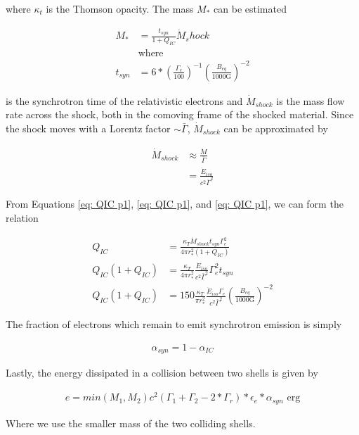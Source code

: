 \documentclass[linenumbers,twocolumn]{aastex631}
\begin{document}
where $\kappa_t$ is the Thomson opacity. The mass $M_{*}$ can be estimated

\begin{align} \label{eq: QIC p2}
	M_{*} &= \frac{t_{syn}}{1+Q_{IC}} \dot{M}_shock \\
	&\text{where}\\
	t_{syn} &= 6*\left(\frac{\Gamma_e}{100}\right)^{-1} \left(\frac{B_{eq}}{1000\text{G}}\right)^{-2}
\end{align}

is the synchrotron time of the relativistic electrons and $\dot{M}_{shock}$ is the mass flow rate across the shock, both in the comoving frame of the shocked material. Since the shock moves with a Lorentz factor $\sim \bar{\Gamma}$, $\dot{M}_{shock}$ can be approximated by 

\begin{align} \label{eq: QIC p3}
	\dot{M}_{shock} &\approx \frac{\dot{M}}{\bar{\Gamma}} \\
	&= \frac{\dot{E}_{iso}}{c^2 \bar{\Gamma}^2} 
\end{align}

From Equations \ref{eq: QIC p1}, \ref{eq: QIC p1}, and \ref{eq: QIC p1}, we can form the relation

\begin{align}
	Q_{IC} &= \frac{\kappa_T \dot{M}_{shock} t_{syn} \Gamma_e^2}{4\pi r_{*}^2 (1+Q_{IC})}\\ 
	Q_{IC}(1+Q_{IC}) &= \frac{\kappa_T}{4 \pi r_{*}^2} \frac{\dot{E}_{iso}}{c^2 \bar{\Gamma}^2} \Gamma_e^2 t_{syn}\\
	Q_{IC}(1+Q_{IC}) &= 150 \frac{\kappa_T}{\pi r_{*}^2} \frac{\dot{E}_{iso}\Gamma_e}{c^2 \bar{\Gamma}^2} \left(\frac{B_{eq}}{1000\text{G}}\right)^{-2}
\end{align}

The fraction of electrons which remain to emit synchrotron emission is simply 

\begin{align}
	\alpha_{syn} = 1 - \alpha_{IC}
\end{align}

Lastly, the energy dissipated in a collision between two shells is given by

\begin{align}
	e = min(M_1,M_2) c^2 (\Gamma_1 + \Gamma_2 - 2*\Gamma_r) * \epsilon_e * \alpha_{syn} \text{ erg}
\end{align}

Where we use the smaller mass of the two colliding shells.
\end{document}

